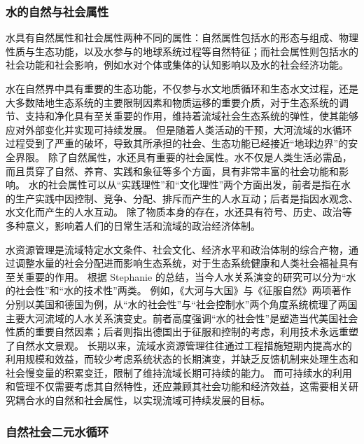 \subsubsection{水的自然与社会属性}

水具有自然属性和社会属性两种不同的属性\cite{ning2004}：自然属性包括水的形态与组成、物理性质与生态功能，以及水参与的地球系统过程等自然特征；而社会属性则包括水的社会功能和社会影响，例如水对个体或集体的认知影响以及水的社会经济功能。

水在自然界中具有重要的生态功能，不仅参与水文地质循环和生态水文过程，还是大多数陆地生态系统的主要限制因素和物质运移的重要介质，对于生态系统的调节、支持和净化具有至关重要的作用，维持着流域社会生态系统的弹性，使其能够应对外部变化并实现可持续发展\cite{gleeson2020a}。
但是随着人类活动的干预，大河流域的水循环过程受到了严重的破坏，导致其所承担的社会、生态功能已经接近“地球边界”的安全界限\cite{gleeson2020}。
除了自然属性，水还具有重要的社会属性。水不仅是人类生活必需品，而且贯穿了自然、养育、实践和象征等多个方面，具有非常丰富的社会功能和影响\cite{zhangyahui2008}。
水的社会属性可以从“实践理性”和“文化理性”两个方面出发，前者是指在水的生产实践中因控制、竞争、分配、排斥而产生的人水互动；后者是指因水观念、水文化而产生的人水互动\cite{zhangyahui2008}。
除了物质本身的存在，水还具有符号、历史、政治等多种意义，影响着人们的日常生活和流域的政治经济体制\cite{ballestero2019}。

水资源管理是流域特定水文条件、社会文化、经济水平和政治体制的综合产物，通过调整水量的社会分配进而影响生态系统，对于生态系统健康和人类社会福祉具有至关重要的作用。
根据 Stephanie 的总结\cite{scarrow2021}，当今人\textendash{}水关系演变的研究可以分为“水的社会性”和“水的技术性”两类。
例如，《大河与大国》\cite{MaDing2021}与《征服自然》\cite{DaWei2019}两项著作分别以美国和德国为例，从“水的社会性”与“社会控制水”两个角度系统梳理了两国主要大河流域的人\textendash{}水关系演变史。前者高度强调“水的社会性”是塑造当代美国社会性质的重要自然因素；后者则指出德国出于征服和控制的考虑，利用技术永远重塑了自然水文景观。
长期以来，流域水资源管理往往通过工程措施短期内提高水的利用规模和效益，而较少考虑系统状态的长期演变，并缺乏反馈机制来处理生态和社会慢变量的积累变迁，限制了维持流域长期可持续的能力\cite{falkenmark2021}。
而可持续水的利用和管理不仅需要考虑其自然特性，还应兼顾其社会功能和经济效益，这需要相关研究耦合水的自然和社会属性，以实现流域可持续发展的目标。

\subsubsection{自然\textendash{}社会二元水循环}

